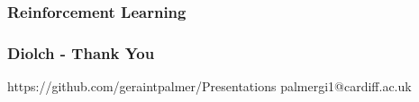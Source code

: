 \documentclass{beamer}
\begin{document}

\begin{frame}
    \frametitle{Reinforcement Learning}
\end{frame}

\begin{frame}
    \frametitle{Diolch - Thank You}
    https://github.com/geraintpalmer/Presentations
    palmergi1@cardiff.ac.uk
\end{frame}
\end{document}
